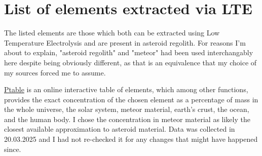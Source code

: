\documentclass[a4paper]{article}
\begin{document}
	\pagebreak
	
	\section{List of elements extracted via LTE}
	
	The listed elements are those which both can be extracted using Low Temperature Electrolysis and are present in asteroid regolith.
	For reasons I'm about to explain, "asteroid regolith" and "meteor" had been used interchangably here despite being obviously different, as that is an equivalence that my choice of my sources forced me to assume.
	
	\medskip
	
	\href{https://ptable.com/#Properties/Abundance/Meteor}{Ptable} is an online interactive table of elements, which among other functions, provides the exact concentration of the chosen element as a percentage of mass in the whole universe, the solar system, meteor material, earth's crust, the ocean, and the human body.
	I chose the concentration in meteor material as likely the closest available approximation to asteroid material.
	Data was collected in 20.03.2025 and I had not re-checked it for any changes that might have happened since.
    
\end{document}
